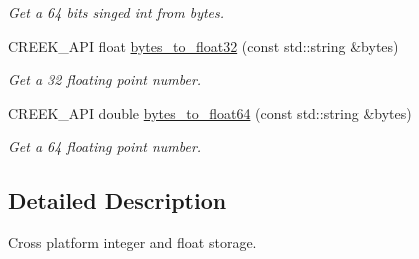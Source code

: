 \begin{DoxyCompactItemize}
\begin{DoxyCompactList}\small\item\em Get a 64 bits singed int from bytes. \end{DoxyCompactList}\item 
C\+R\+E\+E\+K\+\_\+\+A\+PI float \hyperlink{namespacecreek_1_1_endian_ab3144cb48fb9b4dc826fe5f58c94dec1}{bytes\+\_\+to\+\_\+float32} (const std\+::string \&bytes)\hypertarget{namespacecreek_1_1_endian_ab3144cb48fb9b4dc826fe5f58c94dec1}{}\label{namespacecreek_1_1_endian_ab3144cb48fb9b4dc826fe5f58c94dec1}

\begin{DoxyCompactList}\small\item\em Get a 32 floating point number. \end{DoxyCompactList}\item 
C\+R\+E\+E\+K\+\_\+\+A\+PI double \hyperlink{namespacecreek_1_1_endian_ae73320a4e59ffb36e9e49947f17b1ae2}{bytes\+\_\+to\+\_\+float64} (const std\+::string \&bytes)\hypertarget{namespacecreek_1_1_endian_ae73320a4e59ffb36e9e49947f17b1ae2}{}\label{namespacecreek_1_1_endian_ae73320a4e59ffb36e9e49947f17b1ae2}

\begin{DoxyCompactList}\small\item\em Get a 64 floating point number. \end{DoxyCompactList}\end{DoxyCompactItemize}


\subsection{Detailed Description}
Cross platform integer and float storage. 